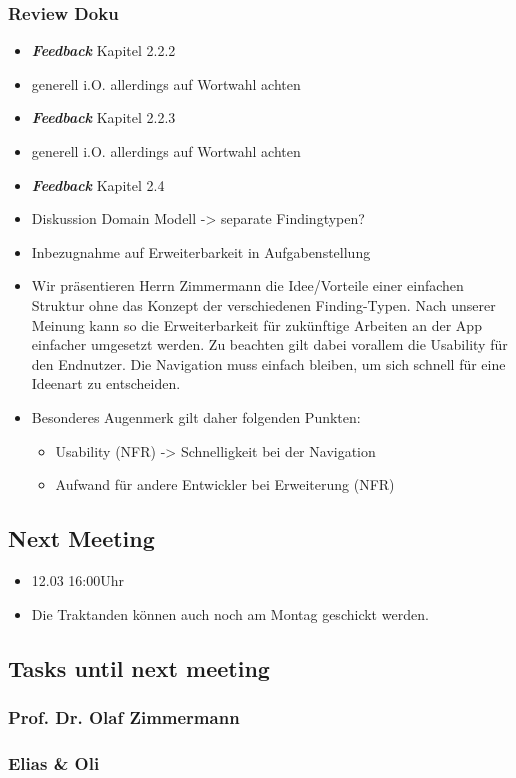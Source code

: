 \hypertarget{review-doku}{%
\subsubsection*{Review Doku}\label{review-doku}}

\begin{itemize}
\item
  \emph{\textbf{Feedback}} Kapitel 2.2.2
\item
  generell i.O. allerdings auf Wortwahl achten
\item
  \emph{\textbf{Feedback}} Kapitel 2.2.3
\item
  generell i.O. allerdings auf Wortwahl achten
\item
  \emph{\textbf{Feedback}} Kapitel 2.4
\item
  Diskussion Domain Modell -\textgreater{} separate Findingtypen?
\item
  Inbezugnahme auf Erweiterbarkeit in Aufgabenstellung
\item
  Wir präsentieren Herrn Zimmermann die Idee/Vorteile einer einfachen Struktur ohne das Konzept der verschiedenen Finding-Typen. Nach unserer Meinung kann so die Erweiterbarkeit für zukünftige Arbeiten an der App einfacher umgesetzt werden. Zu beachten gilt dabei vorallem die Usability für den Endnutzer. Die Navigation muss einfach bleiben, um sich schnell für eine Ideenart zu entscheiden.
\item
  Besonderes Augenmerk gilt daher folgenden Punkten:
  \begin{itemize}
  \item
    Usability (NFR) -\textgreater{} Schnelligkeit bei der Navigation
  \item Aufwand für andere Entwickler bei Erweiterung (NFR)
  \end{itemize}
\end{itemize}

\hypertarget{next-meeting}{%
\subsection*{Next Meeting}\label{next-meeting}}

\begin{itemize}

\item
  12.03 16:00Uhr
\item
  Die Traktanden können auch noch am Montag geschickt werden.
\end{itemize}

\hypertarget{tasks-until-next-meeting}{%
\subsection*{Tasks until next meeting}\label{tasks-until-next-meeting}}

\hypertarget{prof-dr-olaf-zimmermann}{%
\subsubsection*{Prof. Dr. Olaf
Zimmermann}\label{prof-dr-olaf-zimmermann}}

\hypertarget{elias--oli}{%
\subsubsection*{Elias \& Oli}\label{elias--oli}}